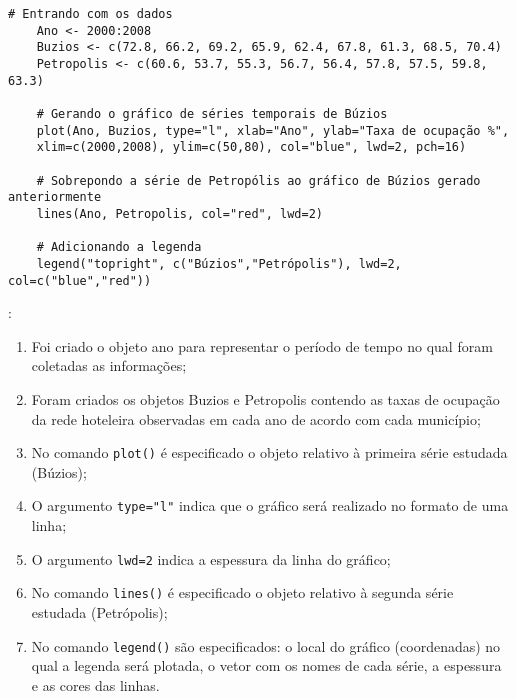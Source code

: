 \documentclass[11pt,fleqn]{book} %
\begin{document}
\begin{scriptsize}
	\estiloR
	\begin{lstlisting}[caption={Comandos do software R}, label=lst:Rgraf9]
	# Entrando com os dados
	Ano <- 2000:2008
	Buzios <- c(72.8, 66.2, 69.2, 65.9, 62.4, 67.8, 61.3, 68.5, 70.4)
	Petropolis <- c(60.6, 53.7, 55.3, 56.7, 56.4, 57.8, 57.5, 59.8, 63.3)
	
	# Gerando o gráfico de séries temporais de Búzios
	plot(Ano, Buzios, type="l", xlab="Ano", ylab="Taxa de ocupação %", 
	xlim=c(2000,2008), ylim=c(50,80), col="blue", lwd=2, pch=16)
	
	# Sobrepondo a série de Petropólis ao gráfico de Búzios gerado anteriormente
	lines(Ano, Petropolis, col="red", lwd=2) 
	
	# Adicionando a legenda
	legend("topright", c("Búzios","Petrópolis"), lwd=2, col=c("blue","red"))

	\end{lstlisting}
\end{scriptsize}


:

\begin{enumerate}[label=\alph*)]

\item Foi criado o objeto ano para representar o período de tempo no qual foram coletadas as informações;

\item Foram criados os objetos Buzios e Petropolis contendo as taxas de ocupação da rede hoteleira observadas em cada ano de acordo com cada município;

\item No comando \texttt{plot()} é especificado o objeto relativo à primeira série estudada (Búzios);

\item O argumento \texttt{type="l"} indica que o gráfico será realizado no formato de uma linha;

\item O argumento \texttt{lwd=2} indica a espessura da linha do gráfico;

\item No comando \texttt{lines()} é especificado o objeto relativo à segunda série estudada (Petrópolis);

\item No comando \texttt{legend()} são especificados: o local do gráfico (coordenadas) no qual a legenda será plotada, o vetor com os nomes de cada série, a espessura e as cores das linhas.

\end{enumerate}
\end{document}
